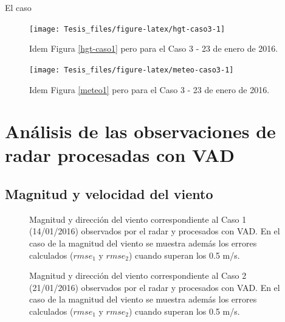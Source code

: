 \documentclass[12pt,spanish,oneside]{book}
\begin{document}
El caso

\begin{figure}

{\centering \texttt{[image: Tesis\_files/figure-latex/hgt-caso3-1]} 

}

\caption{Idem Figura \ref{hgt-caso1} pero para el Caso 3 - 23 de enero de 2016. \label{hgt-caso3}}\label{fig:hgt-caso3}
\end{figure}

\begin{figure}

{\centering \texttt{[image: Tesis\_files/figure-latex/meteo-caso3-1]} 

}

\caption{Idem Figura \ref{meteo1} pero para el Caso 3 - 23 de enero de 2016. \label{meteo3}}\label{fig:meteo-caso3}
\end{figure}

\section{Análisis de las observaciones de radar procesadas con
VAD}\label{analisis-de-las-observaciones-de-radar-procesadas-con-vad}

\subsection{Magnitud y velocidad del
viento}\label{magnitud-y-velocidad-del-viento}

\begin{figure}
\newline{}\caption{Magnitud y dirección del viento  correspondiente al Caso 1 (14/01/2016) observados por el radar y procesados con VAD. En el caso de la magnitud del viento se muestra además los errores calculados ($rmse_1$ y $rmse_2$) cuando superan los 0.5 m/s. \label{campo-caso1}}\label{fig:campo-caso1}
\end{figure}

\begin{figure}
\newline{}\caption{Magnitud y dirección del viento  correspondiente al Caso 2 (21/01/2016) observados por el radar y procesados con VAD. En el caso de la magnitud del viento se muestra además los errores calculados ($rmse_1$ y $rmse_2$) cuando superan los 0.5 m/s. \label{campo-caso2}}\label{fig:campo-caso2}
\end{figure}
\end{document}
